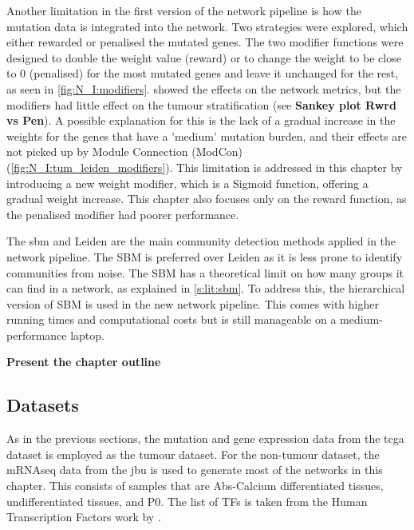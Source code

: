 Another limitation in the first version of the network pipeline is how the mutation data is integrated into the network. Two strategies were explored, which either rewarded or penalised the mutated genes. The two modifier functions were designed to double the weight value (reward) or to change the weight to be close to 0 (penalised) for the most mutated genes and leave it unchanged for the rest, as seen in \cref{fig:N_I:modifiers}.  showed the effects on the network metrics, but the modifiers had little effect on the tumour stratification (see \textbf{Sankey plot Rwrd vs Pen}). A possible explanation for this is the lack of a gradual increase in the weights for the genes that have a 'medium' mutation burden, and their effects are not picked up by Module Connection (ModCon) (\cref{fig:N_I:tum_leiden_modifiers}). This limitation is addressed in this chapter by introducing a new weight modifier, which is a Sigmoid function, offering a gradual weight increase. This chapter also focuses only on the reward function, as the penalised modifier had poorer performance.


The \acrfull{sbm} and Leiden are the main community detection methods applied in the network pipeline. The SBM is preferred over Leiden as it is less prone to identify communities from noise. The SBM has a theoretical limit on how many groups it can find in a network, as explained in \cref{s:lit:sbm}. To address this, the hierarchical version of SBM is used in the new network pipeline. This comes with higher running times and computational costs but is still manageable on a medium-performance laptop.

\textbf{Present the chapter outline}


\subsection*{Datasets}

As in the previous sections, the mutation and gene expression data from the \acrshort{tcga} dataset is employed as the tumour dataset. For the non-tumour dataset, the mRNAseq data from the \acrfull{jbu} is used to generate most of the networks in this chapter. This consists of samples that are Abs-Calcium differentiated tissues, undifferentiated tissues, and P0. The list of TFs is taken from the Human Transcription Factors work by \citet{Lambert2018-el}.




